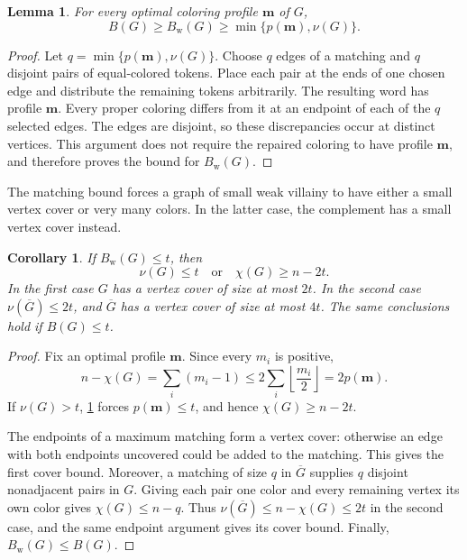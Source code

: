 \documentclass[10pt,a4paper]{amsart}
\numberwithin{equation}{section}
\newtheorem{lemma}[theorem]{Lemma}
\newtheorem{corollary}[theorem]{Corollary}
\theoremstyle{definition}
\theoremstyle{remark}
\begin{document}

\begin{lemma}\label{rec:matching}
For every optimal coloring profile $\mathbf m$ of $G$,
\[
B(G)\geq B_{\mathrm w}(G)\geq\min\{p(\mathbf m),\nu(G)\}.
\]
\end{lemma}
\begin{proof}
Let $q=\min\{p(\mathbf m),\nu(G)\}$. Choose $q$ edges of a matching
and $q$ disjoint pairs of equal-colored tokens. Place each pair at the
ends of one chosen edge and distribute the remaining tokens arbitrarily.
The resulting word has profile $\mathbf m$. Every proper coloring
differs from it at an endpoint of each of the $q$ selected edges.
The edges are disjoint, so these discrepancies occur at distinct
vertices. This argument does not require the repaired coloring to
have profile $\mathbf m$, and therefore proves the bound for $B_{\mathrm w}(G)$.
\end{proof}

The matching bound forces a graph of small weak villainy to have
either a small vertex cover or very many colors. In the latter case,
the complement has a small vertex cover instead.

\begin{corollary}\label{rec:dichotomy}
If $B_{\mathrm w}(G)\leq t$, then
\[
\nu(G)\leq t\quad\text{or}\quad\chi(G)\geq n-2t.
\]
In the first case $G$ has a vertex cover of size at most $2t$.
In the second case $\nu(\overline G)\leq 2t$, and
$\overline G$ has a vertex cover of size at most $4t$.
The same conclusions hold if $B(G)\leq t$.
\end{corollary}
\begin{proof}
Fix an optimal profile $\mathbf m$. Since every $m_i$ is positive,
\[
n-\chi(G)=\sum_i(m_i-1)
\leq 2\sum_i\left\lfloor\frac{m_i}{2}\right\rfloor
=2p(\mathbf m).
\]
If $\nu(G)>t$, \cref{rec:matching} forces $p(\mathbf m)\leq t$,
and hence $\chi(G)\geq n-2t$.

The endpoints of a maximum matching form a vertex cover: otherwise
an edge with both endpoints uncovered could be added to the matching.
This gives the first cover bound. Moreover, a matching of size $q$ in
$\overline G$ supplies $q$ disjoint nonadjacent pairs in $G$. Giving
each pair one color and every remaining vertex its own color gives
$\chi(G)\leq n-q$. Thus $\nu(\overline G)\leq n-\chi(G)\leq 2t$
in the second case, and the same endpoint argument gives its cover
bound. Finally, $B_{\mathrm w}(G)\leq B(G)$.
\end{proof}
\end{document}
